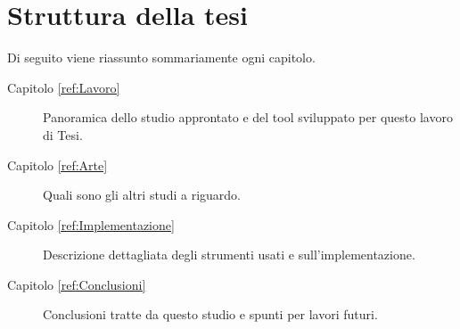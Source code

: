 
\section{Struttura della tesi}

Di seguito viene riassunto sommariamente ogni capitolo.

\begin{description}
	\item[Capitolo \ref{ref:Lavoro}] Panoramica dello studio approntato e del tool sviluppato per questo lavoro di Tesi.

	\item[Capitolo \ref{ref:Arte}] Quali sono gli altri studi a riguardo.

	\item[Capitolo \ref{ref:Implementazione}] Descrizione dettagliata degli strumenti usati e sull'implementazione.

	\item[Capitolo \ref{ref:Conclusioni}] Conclusioni tratte da questo studio e spunti per lavori futuri.

\end{description}